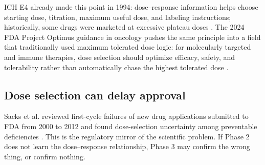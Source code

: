 \documentclass[a4paper]{article}
\begin{document}
\begin{center}
\end{center}

ICH E4 already made this point in 1994: dose--response information helps choose starting dose, titration, maximum useful dose, and labeling instructions; historically, some drugs were marketed at excessive plateau doses \cite{ichE4DoseResponse}. The 2024 FDA Project Optimus guidance in oncology pushes the same principle into a field that traditionally used maximum tolerated dose logic: for molecularly targeted and immune therapies, dose selection should optimize efficacy, safety, and tolerability rather than automatically chase the highest tolerated dose \cite{fda2024projectOptimus}.

\subsection{Dose selection can delay approval}

Sacks et al. reviewed first-cycle failures of new drug applications submitted to FDA from 2000 to 2012 and found dose-selection uncertainty among preventable deficiencies \cite{sacks2014delay}. This is the regulatory mirror of the scientific problem. If Phase 2 does not learn the dose--response relationship, Phase 3 may confirm the wrong thing, or confirm nothing.
\end{document}
